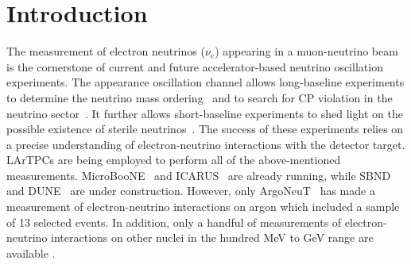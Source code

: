 \documentclass[%
 reprint,
 twocolumn,
superscriptaddress,
showpacs,preprintnumbers,
 amsmath,amssymb,
 aps,
prd,
longbibliography
]{revtex4-1}
\begin{document}
\section{Introduction } 

The measurement of electron neutrinos ($\nu_e$) appearing in a muon-neutrino beam 
is the cornerstone of current and future accelerator-based neutrino oscillation experiments.
The appearance oscillation channel allows long-baseline experiments to determine the neutrino mass ordering~\cite{NOvA:2018gge} and to search for CP violation in the neutrino sector~\cite{dune_cp,hyperk_cpv_search}. It further allows short-baseline experiments to shed light on the possible existence of sterile neutrinos~\cite{sbnproposal}.
The success of these experiments relies on a precise understanding of electron-neutrino interactions with the detector target.
LArTPCs are being employed to perform all of the above-mentioned measurements. MicroBooNE~\cite{microboone_experiment} and ICARUS~\cite{sbnproposal} are already running, while SBND~\cite{sbnproposal} and DUNE~\cite{dune_vol2} are under construction. However, only ArgoNeuT~\cite{Acciarri:2020lhp} has made a measurement of electron-neutrino interactions on argon which included a sample of 13 selected events. In addition, only a handful of measurements of electron-neutrino interactions on other nuclei in the hundred MeV to GeV range are available \cite{gargamelle,t2k_nue,Minerva_nue}. 
\end{document}
